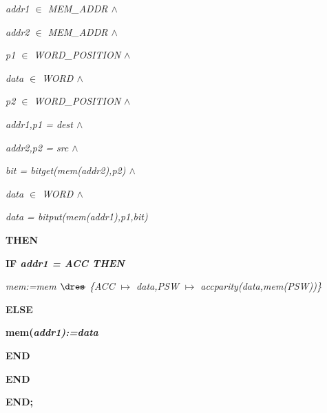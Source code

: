 \begin{sloppypar}
\hspace*{0.30in}\it addr1 $\in$  \it MEM\_ADDR  $\land$ 

\hspace*{0.30in}\it addr2 $\in$  \it MEM\_ADDR  $\land$ 

\hspace*{0.30in}\it p1 $\in$  \it WORD\_POSITION  $\land$ 

\hspace*{0.30in}\it data $\in$  \it WORD  $\land$ 

\hspace*{0.30in}\it p2 $\in$  \it WORD\_POSITION  $\land$ 

\hspace*{0.30in}\it addr1\rm ,\it p1 \rm = \it dest  $\land$ 

\hspace*{0.30in}\it addr2\rm ,\it p2 \rm = \it src  $\land$ 

\hspace*{0.30in}\it bit \rm = \it bitget\rm (\it mem\rm (\it addr2\rm )\rm ,\it p2\rm )  $\land$ 

\hspace*{0.30in}\it data $\in$  \it WORD  $\land$ 

\hspace*{0.30in}\it data \rm = \it bitput\rm (\it mem\rm (\it addr1\rm )\rm ,\it p1\rm ,\it bit\rm )

\hspace*{0.20in}\bf THEN

\hspace*{0.30in}\bf IF \it addr1 \rm = \it ACC \bf THEN

\hspace*{0.40in}\it mem\rm :=\it mem $\lover$ \rm \{\it ACC $\mapsto$ \it data\rm ,\it PSW $\mapsto$ \it accparity\rm (\it data\rm ,\it mem\rm (\it PSW\rm )\rm )\rm \}

\hspace*{0.30in}\bf ELSE

\hspace*{0.40in}\bf mem\rm (\it addr1\rm )\rm :=\it data

\hspace*{0.30in}\bf END

\hspace*{0.20in}\bf END

\hspace*{0.10in}\bf END\rm ;

\hspace*{0.10in} 


\end{sloppypar}
